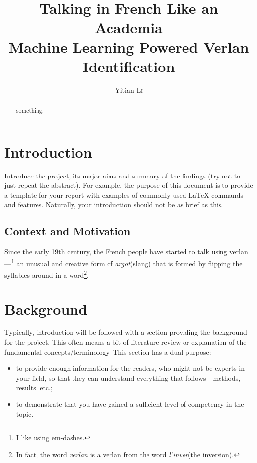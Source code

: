 \documentclass[12pt]{article}
\title{Talking in French Like an Academia\\\large Machine Learning Powered Verlan Identification}
\author{Yitian \textsc{Li}}
\begin{document}
\maketitle
\begin{abstract}
something.
\end{abstract}

\section{Introduction}

Introduce the project, its major aims and summary of the findings (try not to just repeat the abstract). For example, the purpose of this document is to provide a template for your report with examples of commonly used \LaTeX{} commands and features. Naturally, your introduction should not be as brief as this.
 
 
\subsection {Context and Motivation}
Since the early 19th century, the French people have started to talk using verlan ---\footnote{I like using em-dashes.} an unusual and creative form of \textit{argot}(slang) that is formed by flipping the syllables around in a word\footnote{In fact, the word \textit{verlan} is a verlan from the word \textit{l'inver}(the inversion).}\cite{rajabov2025,bach2018}.

\section{Background}

Typically, introduction will be followed with a section providing the background for the project. This often means a bit of literature review or explanation of the fundamental concepts/terminology. This section has a dual purpose: 
\begin{itemize}
\item to provide enough information for the readers, who might not be experts in your field, so that they can understand everything that follows - methods, results, etc.;
\item to demonstrate that you have gained a sufficient level of competency in the topic.
\end{itemize}
\end{document}
